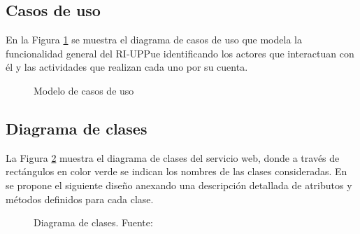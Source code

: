 \subsection{Casos de uso}

En la Figura \ref{casoUso1} se muestra el diagrama de casos de uso que modela la funcionalidad general del RI-UPPue identificando los actores que interactuan con \'el y las actividades que realizan cada uno por su cuenta.\newline

\begin{figure}[!ht]
	\centering
    \caption{Modelo de casos de uso} %
    \label{casoUso1}
\end{figure}

\subsection{Diagrama de clases}

La Figura \ref{diagramaClases1} muestra el diagrama de clases del servicio web, donde a trav\'es de rect\'angulos en color verde se indican los nombres de las clases consideradas. En \cite{SOMIdiseno} se propone el siguiente dise\~{n}o anexando una descripci\'on detallada de atributos y m\'etodos definidos para cada clase.

\begin{figure}[!ht]
	\centering
    \caption{Diagrama de clases. Fuente: \cite{SOMIdiseno}} %
    \label{diagramaClases1}
\end{figure}


